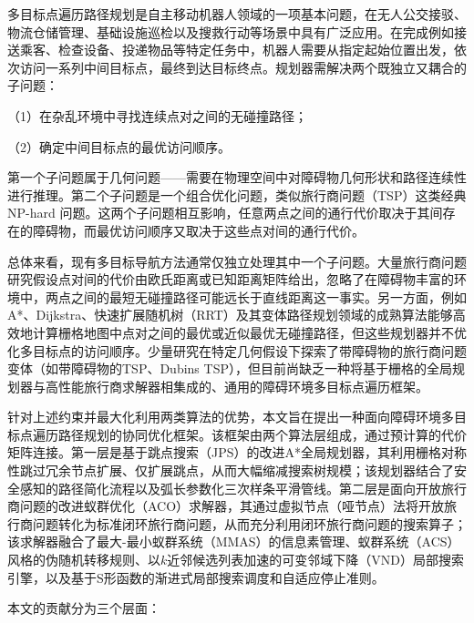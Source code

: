 \documentclass[lettersize,journal]{IEEEtran}
\begin{document}
多目标点遍历路径规划是自主移动机器人领域的一项基本问题，在无人公交接驳、物流仓储管理、基础设施巡检以及搜救行动等场景中具有广泛应用\textcolor{blue}{\cite{ref1,ref2,ref33,ref37,ref38}}。在完成例如接送乘客、检查设备、投递物品等特定任务中，机器人需要从指定起始位置出发，依次访问一系列中间目标点，最终到达目标终点。规划器需解决两个既独立又耦合的子问题：

（1）在杂乱环境中寻找连续点对之间的无碰撞路径；

（2）确定中间目标点的最优访问顺序。

第一个子问题属于几何问题——需要在物理空间中对障碍物几何形状和路径连续性进行推理。第二个子问题是一个组合优化问题，类似旅行商问题（TSP）这类经典 NP-hard 问题。这两个子问题相互影响，任意两点之间的通行代价取决于其间存在的障碍物，而最优访问顺序又取决于这些点对间的通行代价。

总体来看，现有多目标导航方法通常仅独立处理其中一个子问题。大量旅行商问题研究假设点对间的代价由欧氏距离或已知距离矩阵给出\textcolor{blue}{\cite{ref4,ref36}}，忽略了在障碍物丰富的环境中，两点之间的最短无碰撞路径可能远长于直线距离这一事实\textcolor{blue}{\cite{ref39}}。另一方面，例如A*、Dijkstra、快速扩展随机树（RRT）及其变体路径规划领域的成熟算法能够高效地计算栅格地图中点对之间的最优或近似最优无碰撞路径，但这些规划器并不优化多目标点的访问顺序\textcolor{blue}{\cite{ref5,ref6,ref7}}。少量研究在特定几何假设下探索了带障碍物的旅行商问题变体（如带障碍物的TSP、Dubins TSP），但目前尚缺乏一种将基于栅格的全局规划器与高性能旅行商求解器相集成的、通用的障碍环境多目标点遍历框架。

针对上述约束并最大化利用两类算法的优势，本文旨在提出一种面向障碍环境多目标点遍历路径规划的协同优化框架。该框架由两个算法层组成，通过预计算的代价矩阵连接。第一层是基于跳点搜索（JPS）的改进A*全局规划器，其利用栅格对称性跳过冗余节点扩展、仅扩展跳点，从而大幅缩减搜索树规模；该规划器结合了安全感知的路径简化流程以及弧长参数化三次样条平滑管线。第二层是面向开放旅行商问题的改进蚁群优化（ACO）求解器，其通过虚拟节点（哑节点）法将开放旅行商问题转化为标准闭环旅行商问题，从而充分利用闭环旅行商问题的搜索算子；该求解器融合了最大-最小蚁群系统（MMAS）的信息素管理、蚁群系统（ACS）风格的伪随机转移规则、以$k$近邻候选列表加速的可变邻域下降（VND）局部搜索引擎，以及基于S形函数的渐进式局部搜索调度和自适应停止准则。

本文的贡献分为三个层面：
\end{document}
